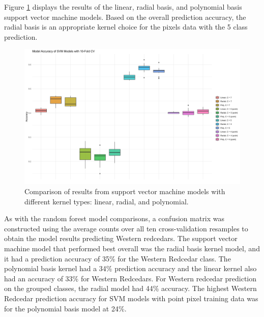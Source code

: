 \documentclass[12pt,twoside]{reedthesis}
\begin{document}
Figure \ref{fig:svmresults} displays the results of the linear, radial basis, and polynomial basis support vector machine models. Based on the overall prediction accuracy, the radial basis is an appropriate kernel choice for the pixels data with the 5 class prediction.
\begin{figure}

{\centering \includegraphics[width=0.9\linewidth]{figure/svmresults} 

}

\caption{Comparison of results from support vector machine models with different kernel types: linear, radial, and polynomial.}\label{fig:svmresults}
\end{figure}
As with the random forest model comparisons, a confusion matrix was constructed using the average counts over all ten cross-validation resamples to obtain the model results predicting Western redcedars. The support vector machine model that performed best overall was the radial basis kernel model, and it had a prediction accuracy of 35\% for the Western Redcedar class. The polynomial basis kernel had a 34\% prediction accuracy and the linear kernel also had an accuracy of 33\% for Western Redcedars. For Western redcedar prediction on the grouped classes, the radial model had 44\% accuracy. The highest Western Redcedar prediction accuracy for SVM models with point pixel training data was for the polynomial basis model at 24\%.
\end{document}
